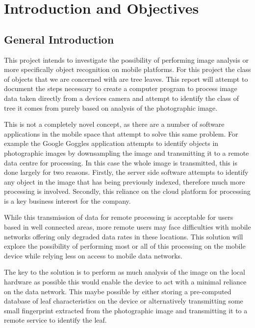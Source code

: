 \chapter{Introduction and Objectives}

\section{General Introduction}
This project intends to investigate the possibility of performing image analysis or more specifically object recognition on mobile platforms. For this project the class of objects that we are concerned with are tree leaves. This report will attempt to document the steps necessary to create a computer program to process image data taken directly from a devices camera and attempt to identify the class of tree it comes from purely based on analysis of the photographic image.

This is not a completely novel concept, as there are a number of software applications in the mobile space that attempt to solve this same problem. For example the Google Goggles\textsuperscript{\texttrademark} application attempts to identify objects in photographic images by downsampling the image and transmitting it to a remote data centre for processing. In this case the whole image is transmitted, this is done largely for two reasons. Firstly, the server side software attempts to identify any object in the image that has being previously indexed, therefore much more processing is involved. Secondly, this reliance on the cloud platform for processing is a key business interest for the company.

While this transmission of data for remote processing is acceptable for users based in well connected areas, more remote users may face difficulties with mobile networks offering only degraded data rates in these locations. This solution will explore the possibility of performing most or all of this processing on the mobile device while relying less on access to mobile data networks.

The key to the solution is to perform as much analysis of the image on the local hardware as possible this would enable the device to act with a minimal reliance on the data network. This maybe possible by either storing a pre-computed database of leaf characteristics on the device or alternatively transmitting some small fingerprint extracted from the photographic image and transmitting it to a remote service to identify the leaf.


